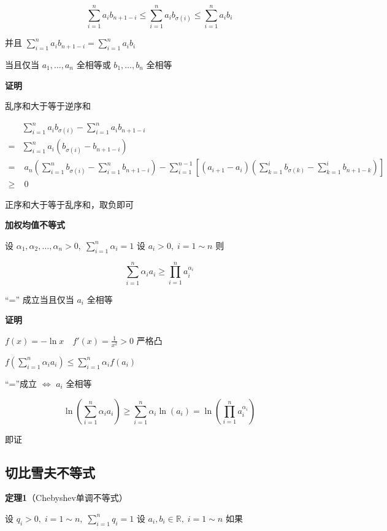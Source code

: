 \[
\sum_{i=1}^{n}a_{i}b_{n+1-i}\leq \sum_{i=1}^{n}a_{i}b_{\sigma(i)}\leq \sum_{i=1}^{n}a_{i}b_{i}
\]

并且 \(\sum_{i=1}^{n}a_{i}b_{n+1-i}=\sum_{i=1}^{n}a_{i}b_{i}\)

当且仅当 \(a_{1},\dots,a_{n}\) 全相等或 \(b_{1},\dots,b_{n}\) 全相等

\textbf{证明}

乱序和大于等于逆序和

\[
\begin{aligned}
&\sum_{i=1}^{n}a_{i}b_{\sigma(i)}-\sum_{i=1}^{n}a_{i}b_{n+1-i}\\
=&\sum_{i=1}^{n}a_{i}\left(b_{\sigma(i)}-b_{n+1-i}\right)\\
=&\;a_{n}\left( \sum_{i=1}^{n} b_{\sigma(i)}- \sum_{i=1}^{n}  b_{n+1-i} \right)-\sum_{i=1}^{n-1} \left[(a_{i+1}-a_{i})\left(\sum_{k=1}^{i}b_{\sigma(k)}-\sum_{k=1}^{i} b_{n+1-k} \right)\right]\\
\geq &\; 0
\end{aligned}
\]

正序和大于等于乱序和，取负即可

\textbf{加权均值不等式}

设
\(\alpha_{1}, \alpha_{2}, \dots ,\alpha_{n}>0,\; \sum_{i=1}^{n}\alpha_{i}=1\)
设 \(a_{i}>0, \; i=1\sim n\) 则

\[
\sum_{i=1}^{n}\alpha_{i}a_{i}\geq \prod_{i=1}^{n}a_{i}^{\alpha_{i}}
\]

``='' 成立当且仅当 \(a_{i}\) 全相等

\textbf{证明}

\(f(x)=-\ln x \quad f'(x)=\frac{1}{x^{2}}>0\) 严格凸

\(f\left( \sum_{i=1}^{n }\alpha_{i}a_{i} \right)\leq \sum_{i=1}^{n}\alpha_{i}f(a_{i})\)

``=''成立 \(\Leftrightarrow\) \(a_{i}\) 全相等

\[
\ln\left( \sum_{i=1}^{n}\alpha_{i}a_{i} \right)\geq \sum_{i=1}^{n}\alpha_{i}\ln(a_{i})
=\ln\left( \prod_{i=1}^{n}a_{i}^{\alpha_{i}} \right)
\]

即证

\subsection{切比雪夫不等式}\label{ux5207ux6bd4ux96eaux592bux4e0dux7b49ux5f0f}

\textbf{定理1}（Chebyshev单调不等式）

设 \(q_{i}>0,\;  i=1\sim n, \; \sum_{i=1}^{n}q_{i}=1\) 设
\(a_{i},b_{i}\in \mathbb{R}, \; i=1\sim n\) 如果

